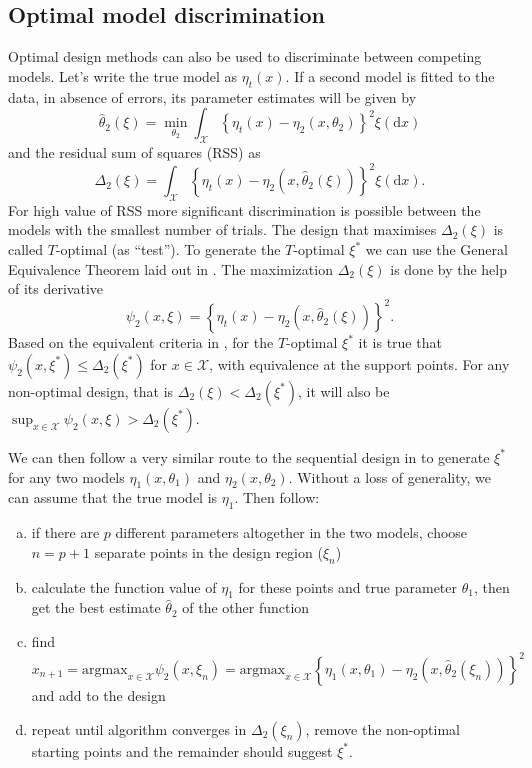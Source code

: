 \documentclass[12pt]{iopart}
\begin{document}
\subsection{Optimal model discrimination}
\label{sec:modeldiscrimination}
Optimal design methods can also be used to discriminate between competing models. Let's write the true model as $\eta_t(x)$. If a second model is fitted to the data, in absence of errors, its parameter estimates will be given by
\begin{equation}
\hat \theta_2(\xi) = \min_{\theta_2} \int_{\mathcal{X}} \left\{\eta_t(x) - \eta_2(x, \theta_2)\right\}^2 \xi(\mathrm{d}x)
\end{equation}
and the residual sum of squares (RSS) as
\begin{equation}
\Delta_2(\xi) = \int_{\mathcal{X}} \left\{\eta_t(x) - \eta_2(x, \hat \theta_2(\xi))\right\}^2 \xi(\mathrm{d}x).
\label{eq:rss}
\end{equation}
For high value of RSS more significant discrimination is possible between the models with the smallest number of trials. The design that maximises $\Delta_2(\xi)$ is called $T$-optimal (as ``test''). To generate the $T$-optimal $\xi^*$ we can use the General Equivalence Theorem laid out in . The maximization $\Delta_2(\xi)$ is done by the help of its derivative
\begin{equation}
\psi_2(x, \xi) = \left\{\eta_t(x) - \eta_2(x, \hat \theta_2(\xi))\right\}^2.
\end{equation}
Based on the equivalent criteria in , for the $T$-optimal $\xi^*$ it is true that $\psi_2(x, \xi^*) \leq \Delta_2(\xi^*)$ for $x \in \mathcal{X}$, with equivalence at the support points. For any non-optimal design, that is $\Delta_2(\xi) < \Delta_2(\xi^*)$, it will also be $\sup_{x \in \mathcal{X}} \psi_2(x, \xi) > \Delta_2(\xi^*)$.

We can then follow a very similar route to the sequential design in  to generate $\xi^*$ for any two models $\eta_1(x, \theta_1)$ and $\eta_2(x, \theta_2)$. Without a loss of generality, we can assume that the true model is $\eta_1$. Then follow:
\begin{enumerate}[(a)]
\item if there are $p$ different parameters altogether in the two models, choose $n = p+1$ separate points in the design region ($\xi_n$)
\item calculate the function value of $\eta_1$ for these points and true parameter $\theta_1$, then get the best estimate $\hat \theta_2$ of the other function
\item find $x_{n+1} = \mathrm{argmax}_{x \in \mathcal{X}}\psi_2(x, \xi_n) = \mathrm{argmax}_{x \in \mathcal{X}} \left\{\eta_1(x, \theta_1) - \eta_2(x, \hat \theta_2(\xi_n))\right\}^2$ and add to the design
\item repeat until algorithm converges in $\Delta_2(\xi_n)$, remove the non-optimal starting points and the remainder should suggest $\xi^*$.
\end{enumerate}
\end{document}

